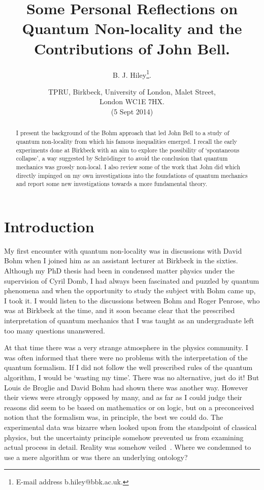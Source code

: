 \documentclass[11pt]{article}
\begin{document}
\title{Some Personal Reflections on Quantum Non-locality and the Contributions of John Bell.}
\author{B. J. Hiley\footnote{E-mail address b.hiley@bbk.ac.uk.}.}
\date{TPRU, Birkbeck, University of London, Malet Street, \\London WC1E 7HX.\\ \vspace{0.4cm}(5 Sept 2014) }
\maketitle

\begin{abstract}
I present the background of the Bohm approach that led John Bell to a study  of quantum non-locality  from which his famous inequalities emerged. I recall the early experiments done at Birkbeck with an aim to explore the possibility of `spontaneous collapse', a way suggested by Schr\"{o}dinger to avoid the conclusion that quantum mechanics was grossly non-local.  I also review some of the work that John did which directly impinged on my own investigations into the foundations of quantum mechanics and report some new investigations towards a more fundamental theory.

\end{abstract}


\section{Introduction}

My first encounter with quantum non-locality was in discussions with David Bohm when I joined him as an assistant lecturer at Birkbeck in the sixties. Although my PhD thesis  had been in condensed matter physics under the supervision of Cyril Domb,  I had always been fascinated and puzzled by quantum phenomena and when the opportunity to study the subject with Bohm came up, I took it.  I would listen to the discussions between Bohm and Roger Penrose, who was at Birkbeck at the time, and it soon became clear that  the prescribed interpretation of quantum mechanics that I was taught as an undergraduate left too many questions unanswered.  

At that time there was a very strange atmosphere in the physics community. I was often informed that there were no problems with the interpretation of the quantum formalism.  If I did not follow the well prescribed rules of the quantum algorithm, I would be `wasting my time'.  There was no alternative, just do it!  But Louis de Broglie and David Bohm had shown there was another way. However their views were strongly opposed by many, and as far as I could judge their reasons did seem to be based on mathematics or on logic, but on a preconceived notion that the formalism was, in principle, the best we could do.    The experimental data was bizarre when looked upon from the standpoint of classical physics, but the uncertainty principle somehow prevented us from examining actual process in detail.  Reality was somehow veiled~\cite {bde03}.
Where we condemned to use a mere algorithm or was there an underlying ontology? 
\end{document}

